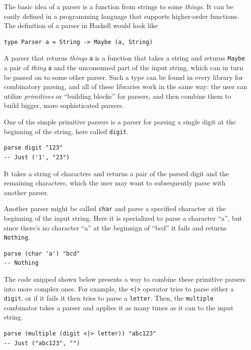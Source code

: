 \documentclass[english,engineering]{wizthesis}
\begin{document}
The basic idea of a parser is a function from strings to some \emph{things}. It
can be easily defined in a programming language that supports higher-order
functions. The definition of a parser in Haskell would look like
\begin{verbatim}
type Parser a = String -> Maybe (a, String)
\end{verbatim}
A parser that returns \emph{things} \texttt{a} is a function that takes a string
and returns \texttt{Maybe} a pair of \emph{thing} \texttt{a} and the unconsumed
part of the input string, which can in turn be passed on to some other parser.
Such a type can be found in every library for combinatory parsing, and all of
these libraries work in the same way: the user can utilize \emph{primitives} or
``building blocks'' for parsers, and then combine them to build bigger, more
sophisticated parsers.

One of the simple primitive parsers is a parser for parsing a single digit at
the beginning of the string, here called \texttt{digit}.
\begin{verbatim}
parse digit "123"
-- Just ('1', "23")
\end{verbatim}
It takes a string of characters and returns a pair of the parsed digit and the
remaining characters, which the user may want to subsequently parse with another
parser.

Another parser might be called \texttt{char} and parse a specified character at
the beginning of the input string. Here it is specialized to parse a character
``a'', but since there's no character ``a'' at the beginnign of ``bcd'' it fails
and returns \texttt{Nothing}.
\begin{verbatim}
parse (char 'a') "bcd"
-- Nothing
\end{verbatim}

The code snipped shown below presents a way to combine these primitive parsers
into more complex ones. For example, the \texttt{<|>} operator tries to parse
either a \texttt{digit}, or if it fails it then tries to parse a
\texttt{letter}. Then, the \texttt{multiple} combinator takes a parser and
applies it as many times as it can to the input string.
\begin{verbatim}
parse (multiple (digit <|> letter)) "abc123"
-- Just ("abc123", "")
\end{verbatim}
\end{document}
